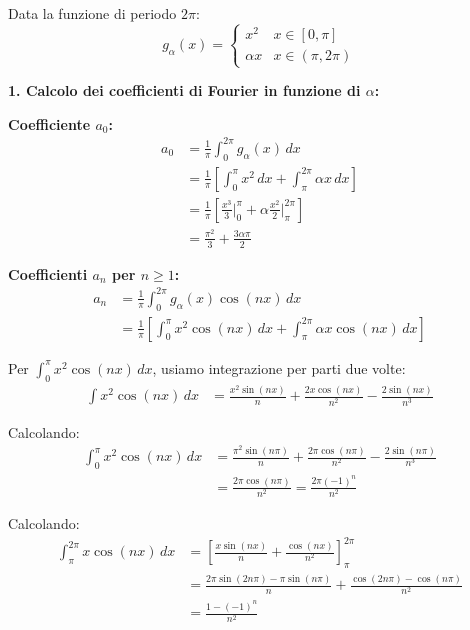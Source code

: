 \begin{esempio}
Data la funzione di periodo \(2\pi\):
\[ g_\alpha(x) = \begin{cases} x^2 & x \in [0,\pi] \\ \alpha x & x \in (\pi,2\pi) \end{cases} \]

\textbf{1. Calcolo dei coefficienti di Fourier in funzione di \(\alpha\):}

\textbf{Coefficiente \(a_0\):}
\begin{align}
a_0 &= \frac{1}{\pi} \int_0^{2\pi} g_\alpha(x) \, dx \\
&= \frac{1}{\pi} \left[ \int_0^\pi x^2 \, dx + \int_\pi^{2\pi} \alpha x \, dx \right] \\
&= \frac{1}{\pi} \left[ \frac{x^3}{3} \Big|_0^\pi + \alpha \frac{x^2}{2} \Big|_\pi^{2\pi} \right] \\
&= \frac{\pi^2}{3} + \frac{3\alpha\pi}{2}
\end{align}

\textbf{Coefficienti \(a_n\) per \(n \geq 1\):}
\begin{align}
a_n &= \frac{1}{\pi} \int_0^{2\pi} g_\alpha(x) \cos(nx) \, dx \\
&= \frac{1}{\pi} \left[ \int_0^\pi x^2 \cos(nx) \, dx + \int_\pi^{2\pi} \alpha x \cos(nx) \, dx \right]
\end{align}

Per \(\int_0^\pi x^2 \cos(nx) \, dx\), usiamo integrazione per parti due volte:
\begin{align}
\int x^2 \cos(nx) \, dx &= \frac{x^2 \sin(nx)}{n} + \frac{2x \cos(nx)}{n^2} - \frac{2 \sin(nx)}{n^3}
\end{align}

Calcolando:
\begin{align}
\int_0^\pi x^2 \cos(nx) \, dx &= \frac{\pi^2 \sin(n\pi)}{n} + \frac{2\pi \cos(n\pi)}{n^2} - \frac{2 \sin(n\pi)}{n^3} \\
&= \frac{2\pi \cos(n\pi)}{n^2} = \frac{2\pi (-1)^n}{n^2}
\end{align}

Calcolando:
\begin{align}
\int_\pi^{2\pi} x \cos(nx) \, dx &= \left[ \frac{x \sin(nx)}{n} + \frac{\cos(nx)}{n^2} \right]_\pi^{2\pi} \\
&= \frac{2\pi \sin(2n\pi) - \pi \sin(n\pi)}{n} + \frac{\cos(2n\pi) - \cos(n\pi)}{n^2} \\
&= \frac{1 - (-1)^n}{n^2}
\end{align}
\end{esempio}
